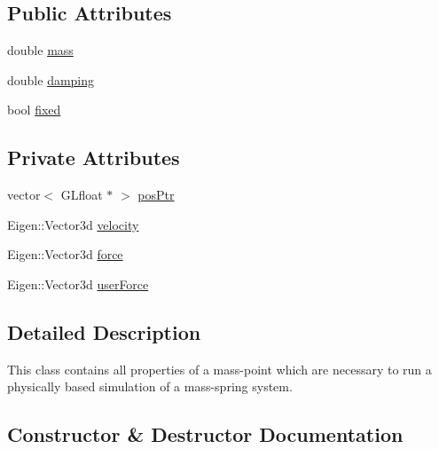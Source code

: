 \subsection*{Public Attributes}
\begin{DoxyCompactItemize}
\item 
double \hyperlink{classMass_a8f37b93ded277000424b7a92adcf9c30}{mass}
\item 
double \hyperlink{classMass_a3b1f3a41fdfc00900a242df309c9c77f}{damping}
\item 
bool \hyperlink{classMass_a596327e28cfa013455a6cd00ca25353e}{fixed}
\end{DoxyCompactItemize}
\subsection*{Private Attributes}
\begin{DoxyCompactItemize}
\item 
vector$<$ G\+Lfloat $\ast$ $>$ \hyperlink{classMass_abfd5e8aa50988458d702763a48cb438e}{pos\+Ptr}
\item 
Eigen\+::\+Vector3d \hyperlink{classMass_ad6fe847559d3f2b4563df4fa3f08f101}{velocity}
\item 
Eigen\+::\+Vector3d \hyperlink{classMass_a5afb4b915d143d4a5156eb7e7e035012}{force}
\item 
Eigen\+::\+Vector3d \hyperlink{classMass_a2e7622d21617bdbf3939ee2ec5784b6d}{user\+Force}
\end{DoxyCompactItemize}


\subsection{Detailed Description}
This class contains all properties of a mass-\/point which are necessary to run a physically based simulation of a mass-\/spring system. 

\subsection{Constructor \& Destructor Documentation}
\hypertarget{classMass_a93c1c52a88d9993644df8b458cacc8ec}{}
